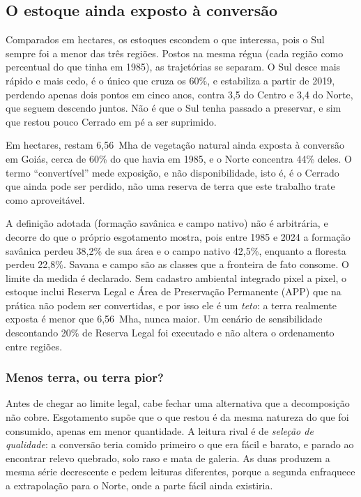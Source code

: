 \subsection{O estoque ainda exposto à conversão}

Comparados em hectares, os estoques escondem o que interessa, pois o Sul sempre foi
a menor das três regiões. Postos na mesma régua (cada região como percentual
do que tinha em 1985), as trajetórias se separam. O Sul desce mais rápido e
mais cedo, é o único que cruza os 60\%, e estabiliza a partir de 2019,
perdendo apenas dois pontos em cinco anos, contra 3,5 do Centro e 3,4 do
Norte, que seguem descendo juntos. Não é que o Sul tenha passado a preservar,
e sim que restou pouco Cerrado em pé a ser suprimido.

Em hectares, restam 6,56~Mha de vegetação natural ainda exposta à conversão
em Goiás, cerca de 60\% do que havia em 1985, e o Norte concentra 44\%
deles. O termo ``convertível'' mede exposição, e não disponibilidade, isto é, é o
Cerrado que ainda pode ser perdido, não uma reserva de terra que este
trabalho trate como aproveitável.

A definição adotada (formação savânica e campo nativo) não é arbitrária, e
decorre do que o próprio esgotamento mostra, pois entre 1985 e 2024 a formação
savânica perdeu 38,2\% de sua área e o campo nativo 42,5\%, enquanto a
floresta perdeu 22,8\%. Savana e campo são as classes que a fronteira de fato
consome. O limite da medida é declarado. Sem cadastro ambiental integrado
pixel a pixel, o estoque inclui Reserva Legal e Área de Preservação Permanente
(APP) que na prática não podem ser convertidas, e por isso ele é um \emph{teto}: a
terra realmente exposta é menor que 6,56~Mha, nunca maior. Um cenário de
sensibilidade descontando 20\% de Reserva Legal foi executado e não altera o
ordenamento entre regiões.

\subsubsection*{Menos terra, ou terra pior?}

Antes de chegar ao limite legal, cabe fechar uma alternativa que a decomposição
não cobre. Esgotamento supõe que o que restou é da mesma natureza do que foi
consumido, apenas em menor quantidade. A leitura rival é de \emph{seleção de
qualidade}: a conversão teria comido primeiro o que era fácil e barato, e
parado ao encontrar relevo quebrado, solo raso e mata de galeria. As duas
produzem a mesma série decrescente e pedem leituras diferentes, porque a
segunda enfraquece a extrapolação para o Norte, onde a parte fácil ainda
existiria.

